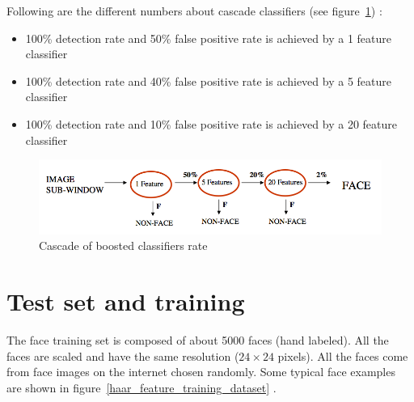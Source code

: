 \noindent Following are the different numbers about cascade classifiers (see figure~\ref{haar_feature_cascade_rate}) \cite{UBC01}:

\begin{itemize}
  \item 100\% detection rate and 50\% false positive rate is achieved by a 1 feature classifier
  \item 100\% detection rate and 40\% false positive rate is achieved by a 5 feature classifier
  \item 100\% detection rate and 10\% false positive rate is achieved by a 20 feature classifier
\end{itemize}

\begin{figure}[!h]
\begin{center}
\noindent \includegraphics[scale=0.5]{figures/haar_feature_cascade_rate} 
\newline
\caption{Cascade of boosted classifiers rate}
\label{haar_feature_cascade_rate}
\end{center} 
\end{figure}

\section{Test set and training}

\vspace{\baselineskip}
\noindent The face training set is composed of about 5000 faces (hand labeled). All the faces are scaled and have the same resolution ($ 24\times24 $ pixels). All the faces come from face images on the internet chosen randomly. Some typical face examples are shown in figure~\ref{haar_feature_training_dataset} \cite{VIO01}.
\newline


